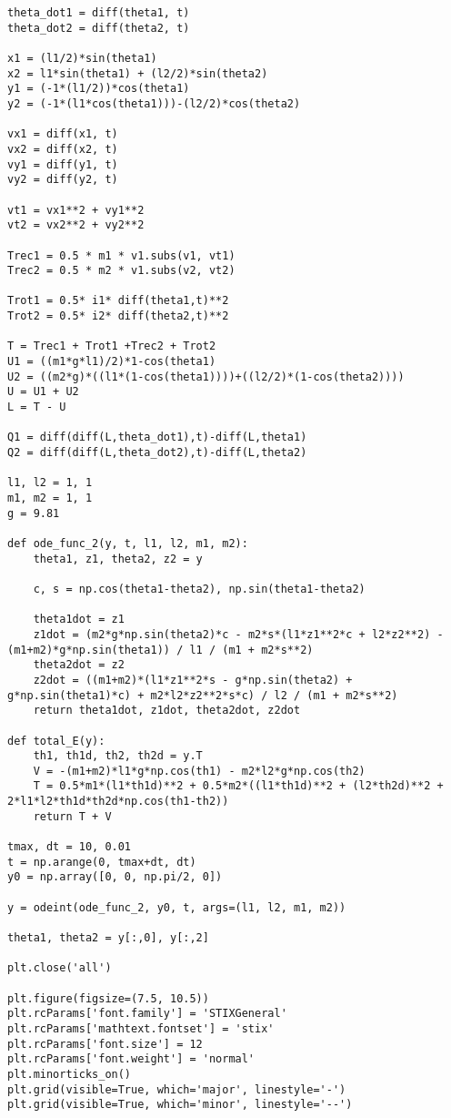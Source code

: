 \documentclass[12pt, a4paper]{article}
\begin{document}
\begin{verbatim}
theta_dot1 = diff(theta1, t)
theta_dot2 = diff(theta2, t)

x1 = (l1/2)*sin(theta1)
x2 = l1*sin(theta1) + (l2/2)*sin(theta2)
y1 = (-1*(l1/2))*cos(theta1)
y2 = (-1*(l1*cos(theta1)))-(l2/2)*cos(theta2)

vx1 = diff(x1, t)
vx2 = diff(x2, t)
vy1 = diff(y1, t)
vy2 = diff(y2, t)

vt1 = vx1**2 + vy1**2
vt2 = vx2**2 + vy2**2

Trec1 = 0.5 * m1 * v1.subs(v1, vt1)
Trec2 = 0.5 * m2 * v1.subs(v2, vt2)

Trot1 = 0.5* i1* diff(theta1,t)**2
Trot2 = 0.5* i2* diff(theta2,t)**2

T = Trec1 + Trot1 +Trec2 + Trot2
U1 = ((m1*g*l1)/2)*1-cos(theta1)
U2 = ((m2*g)*((l1*(1-cos(theta1))))+((l2/2)*(1-cos(theta2))))
U = U1 + U2
L = T - U

Q1 = diff(diff(L,theta_dot1),t)-diff(L,theta1)
Q2 = diff(diff(L,theta_dot2),t)-diff(L,theta2)

l1, l2 = 1, 1
m1, m2 = 1, 1
g = 9.81

def ode_func_2(y, t, l1, l2, m1, m2):
    theta1, z1, theta2, z2 = y

    c, s = np.cos(theta1-theta2), np.sin(theta1-theta2)

    theta1dot = z1
    z1dot = (m2*g*np.sin(theta2)*c - m2*s*(l1*z1**2*c + l2*z2**2) - (m1+m2)*g*np.sin(theta1)) / l1 / (m1 + m2*s**2)
    theta2dot = z2
    z2dot = ((m1+m2)*(l1*z1**2*s - g*np.sin(theta2) + g*np.sin(theta1)*c) + m2*l2*z2**2*s*c) / l2 / (m1 + m2*s**2)
    return theta1dot, z1dot, theta2dot, z2dot

def total_E(y):
    th1, th1d, th2, th2d = y.T
    V = -(m1+m2)*l1*g*np.cos(th1) - m2*l2*g*np.cos(th2)
    T = 0.5*m1*(l1*th1d)**2 + 0.5*m2*((l1*th1d)**2 + (l2*th2d)**2 + 2*l1*l2*th1d*th2d*np.cos(th1-th2))
    return T + V

tmax, dt = 10, 0.01
t = np.arange(0, tmax+dt, dt)
y0 = np.array([0, 0, np.pi/2, 0])

y = odeint(ode_func_2, y0, t, args=(l1, l2, m1, m2))

theta1, theta2 = y[:,0], y[:,2]

plt.close('all')

plt.figure(figsize=(7.5, 10.5))
plt.rcParams['font.family'] = 'STIXGeneral'
plt.rcParams['mathtext.fontset'] = 'stix'
plt.rcParams['font.size'] = 12
plt.rcParams['font.weight'] = 'normal'
plt.minorticks_on()
plt.grid(visible=True, which='major', linestyle='-')
plt.grid(visible=True, which='minor', linestyle='--')


\end{verbatim}
\end{document}
